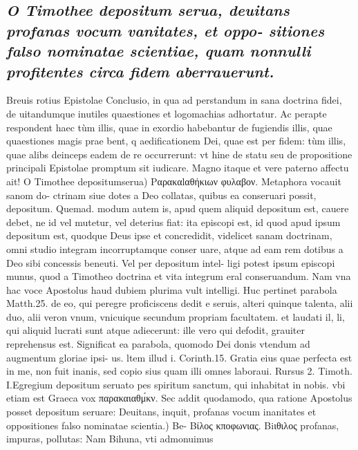 \documentclass{article}
\begin{document}
\begin{pages}
{}
\subsection*{\textit{O Timothee depositum serua, deuitans profanas vocum vanitates, et oppo- sitiones falso nominatae scientiae, quam nonnulli profitentes circa fidem aberrauerunt. }}\pstart Breuis rotius Epistolae Conclusio, in qua ad perstandum in sana doctrina fidei, de uitandumque inutiles quaestiones et logomachias adhortatur. Ac perapte respondent haec tùm illis, quae in exordio habebantur de fugiendis illis, quae quaestiones magis prae bent, q aedificationem Dei, quae est per fidem: tùm illis, quae alibs deinceps eadem de re occurrerunt: vt hine de statu seu de propositione principali Epistolae promptum sit iudicare. Magno itaque et vere paterno affectu ait!  \pend\pstart O Timothee depositumserua) Pαρακαlαθήκιων φυλαβον. Metaphora vocauit sanom do- ctrinam siue dotes a Deo collatas, quibus ea conseruari possit, depositum. Quemad. modum autem is, apud quem aliquid depositum est, cauere debet, ne id vel mutetur, vel deterius fiat: ita episcopi est, id quod apud ipsum depositum est, quodque Deus ipse et concredidit, videlicet sanam doctrinam, omni studio integram incorruptamque conser uare, atque ad eam rem dotibus a Deo sibi concessis beneuti. Vel per depositum intel- ligi potest ipsum episcopi munus, quod a Timotheo doctrina et vita integrum eral conseruandum. Nam vna hac voce Apostolus haud dubiem plurima vult intelligi. Huc pertinet parabola Matth.25. de eo, qui peregre proficiscens dedit e seruis, alteri quinque  talenta, alii duo, alii veron vnum, vnicuique secundum propriam facultatem. et laudati il, li, qui aliquid lucrati sunt atque adiecerunt: ille vero qui defodit, grauiter reprehensus est. Significat ea parabola, quomodo Dei donis vtendum ad augmentum gloriae ipsi- us. ltem illud i. Corinth.15. Gratia eius quae perfecta est in me, non fuit inanis, sed copio sius quam illi omnes laboraui. Rursus 2. Timoth. I.Egregium depositum seruato pes spiritum sanctum, qui inhabitat in nobis. vbi etiam est Graeca vox παρακαιαθμ́κν. Sec addit quodamodo, qua ratione Apostolus posset depositum seruare:  \pend\pstart Deuitans, inquit, profanas vocum inanitates et oppositiones falso nominatae scientia.) Be- Βίλος κποφωνιας. Βiιθιλος profanas, impuras, pollutas: Nam Bihuna, vti admonuimus  \pend

\end{pages}
\end{document}

